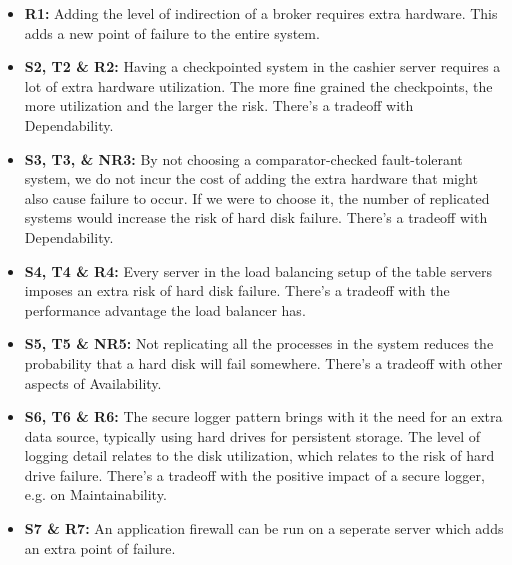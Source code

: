\documentclass[a4paper,11pt]{report}
\begin{document}
\begin{itemize}
\item \textbf{R1:} Adding the level of indirection of a broker requires extra hardware. This adds a new point of failure to the entire system.
\item \textbf{S2, T2 \& R2:} Having a checkpointed system in the cashier server requires a lot of extra hardware utilization. The more fine grained the checkpoints, the more utilization and the larger the risk. There's a tradeoff with Dependability. 
\item \textbf{S3, T3, \& NR3:} By not choosing a comparator-checked fault-tolerant system, we do not incur the cost of adding the extra hardware that might also cause failure to occur. If we were to choose it, the number of replicated systems would increase the risk of hard disk failure. There's a tradeoff with Dependability.
\item \textbf{S4, T4 \& R4:} Every server in the load balancing setup of the table servers imposes an extra risk of hard disk failure. There's a tradeoff with the performance advantage the load balancer has.
\item \textbf{S5, T5 \& NR5:} Not replicating all the processes in the system reduces the probability that a hard disk will fail somewhere. There's a tradeoff with other aspects of Availability.
\item \textbf{S6, T6 \& R6:} The secure logger pattern brings with it the need for an extra data source, typically using hard drives for persistent storage. The level of logging detail relates to the disk utilization, which relates to the risk of hard drive failure. There's a tradeoff with the positive impact of a secure logger, e.g. on Maintainability.
\item \textbf{S7 \& R7:} An application firewall can be run on a seperate server which adds an extra point of failure.
\end{itemize}
\end{document}
